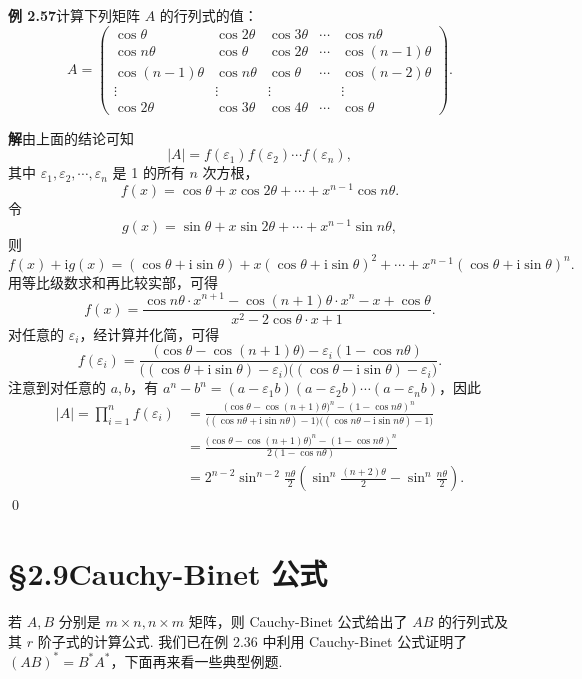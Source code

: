 \documentclass[UTF8,12pt,a4paper,fontset=fandol]{ctexart}
\begin{document}
\noindent\textbf{例 2.57}\quad 计算下列矩阵 $A$ 的行列式的值：
\[
A=
\left(
\begin{array}{ccccc}
\cos\theta & \cos2\theta & \cos3\theta & \cdots & \cos n\theta\\
\cos n\theta & \cos\theta & \cos2\theta & \cdots & \cos(n-1)\theta\\
\cos(n-1)\theta & \cos n\theta & \cos\theta & \cdots & \cos(n-2)\theta\\
\vdots & \vdots & \vdots & & \vdots\\
\cos2\theta & \cos3\theta & \cos4\theta & \cdots & \cos\theta
\end{array}
\right).
\]

\noindent\textbf{解}\quad 由上面的结论可知
\[
|A|=f(\varepsilon_1)f(\varepsilon_2)\cdots f(\varepsilon_n),
\]
其中 $\varepsilon_1,\varepsilon_2,\cdots,\varepsilon_n$ 是 1 的所有 $n$ 次方根，
\[
f(x)=\cos\theta+x\cos2\theta+\cdots+x^{n-1}\cos n\theta.
\]
令
\[
g(x)=\sin\theta+x\sin2\theta+\cdots+x^{n-1}\sin n\theta,
\]
则
\[
f(x)+\mathrm i g(x)=(\cos\theta+\mathrm i\sin\theta)
+x(\cos\theta+\mathrm i\sin\theta)^2+\cdots
+x^{n-1}(\cos\theta+\mathrm i\sin\theta)^n.
\]
用等比级数求和再比较实部，可得
\[
f(x)=\frac{\cos n\theta\cdot x^{n+1}-\cos(n+1)\theta\cdot x^n-x+\cos\theta}
{x^2-2\cos\theta\cdot x+1}.
\]
对任意的 $\varepsilon_i$，经计算并化简，可得
\[
f(\varepsilon_i)=
\frac{\bigl(\cos\theta-\cos(n+1)\theta\bigr)-\varepsilon_i(1-\cos n\theta)}
{\bigl((\cos\theta+\mathrm i\sin\theta)-\varepsilon_i\bigr)
\bigl((\cos\theta-\mathrm i\sin\theta)-\varepsilon_i\bigr)}.
\]
注意到对任意的 $a,b$，有 $a^n-b^n=(a-\varepsilon_1b)(a-\varepsilon_2b)\cdots(a-\varepsilon_nb)$，因此
\[
\begin{aligned}
|A|=\prod_{i=1}^n f(\varepsilon_i)
&=\frac{\bigl(\cos\theta-\cos(n+1)\theta\bigr)^n-(1-\cos n\theta)^n}
{\bigl((\cos n\theta+\mathrm i\sin n\theta)-1\bigr)
\bigl((\cos n\theta-\mathrm i\sin n\theta)-1\bigr)}\\
&=\frac{\bigl(\cos\theta-\cos(n+1)\theta\bigr)^n-(1-\cos n\theta)^n}
{2(1-\cos n\theta)}\\
&=2^{n-2}\sin^{n-2}\frac{n\theta}{2}
\left(\sin^n\frac{(n+2)\theta}{2}-\sin^n\frac{n\theta}{2}\right).
\end{aligned}
\]
\qed

\section*{§2.9\quad Cauchy-Binet 公式}

若 $A,B$ 分别是 $m\times n,n\times m$ 矩阵，则 Cauchy-Binet 公式给出了 $AB$ 的行列式及其 $r$ 阶子式的计算公式. 我们已在例 2.36 中利用 Cauchy-Binet 公式证明了 $(AB)^*=B^*A^*$，下面再来看一些典型例题.
\end{document}
